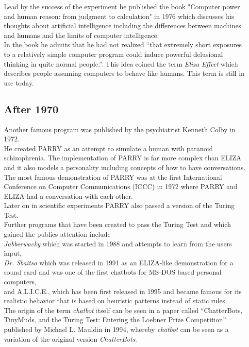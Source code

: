 Lead by the success of the experiment he published the book "Computer power and human reason: from judgment to calculation" in 1976 which discusses his thoughts about artificial intelligence including the differences between machines and humans and the limits of computer intelligence.
\\
In the book he admits that he had not realized ``that extremely short exposures to a relatively simple computer program could induce powerful delusional thinking in quite normal people.''\cite{bbcnowthen}. This idea coined the term \emph{Eliza Effect} which describes people assuming computers to behave like humans. This term is still in use today.


\subsection{After 1970}

Another famous program was published by the psychiatrist Kenneth Colby in 1972.
\\
He created PARRY as an attempt to simulate a human with paranoid schizophrenia. The implementation of PARRY is far more complex than ELIZA and it also models a personality including concepts of how to have conversations.
\\
The most famous demonstration of PARRY was at the first International Conference on Computer Communications (ICCC) in 1972 where PARRY and ELIZA had a conversation with each other.\cite{internethistory}
\\
Later on in scientific experiments PARRY also passed a version of the Turing Test.
\\

Further programs that have been created to pass the Turing Test and which gained the publics attention include
\\
\emph{Jabberwacky} which was started in 1988 and attempts to learn from the users input\cite{jabberwacky},
\\
\emph{Dr. Sbaitso} which was released in 1991 as an ELIZA-like demonstration for a sound card and was one of the first chatbots for MS-DOS based personal computers\cite{pcmag},
\\
and A.L.I.C.E., which has been first released in 1995 and became famous for its realistic behavior that is based on heuristic patterns instead of static rules\cite{approximatinglife}.
\\

The origin of the term \emph{chatbot} itself can be seen in a paper called ``ChatterBots, TinyMuds, and the Turing Test: Entering the Loebner Prize Competition'' published by Michael L. Mauldin in 1994, whereby \emph{chatbot} can be seen as a variation of the original version \emph{ChatterBots}.\cite{aiconf}
\\

